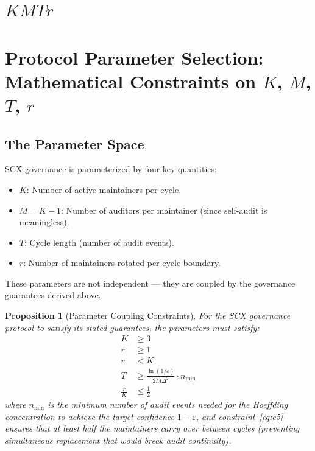\documentclass[12pt,a4paper]{article}
\newtheorem{proposition}[theorem]{Proposition}
\theoremstyle{remark}
\begin{document}
\noindent\textbf{}



\newpage

\section{$K$$M$$T$$r$}
\section{Protocol Parameter Selection: Mathematical Constraints on $K$, $M$, $T$, $r$}

\subsection{The Parameter Space}

SCX governance is parameterized by four key quantities:

\begin{itemize}[leftmargin=*]
    \item $K$: Number of active maintainers per cycle.
    \item $M = K-1$: Number of auditors per maintainer (since self-audit is meaningless).
    \item $T$: Cycle length (number of audit events).
    \item $r$: Number of maintainers rotated per cycle boundary.
\end{itemize}

These parameters are not independent — they are coupled by the governance
guarantees derived above.

\begin{proposition}[Parameter Coupling Constraints]\label{prop:coupling}
For the SCX governance protocol to satisfy its stated guarantees, the parameters
must satisfy:
\begin{align}
    K &\geq 3 \label{eq:c1} \\
    r &\geq 1 \label{eq:c2} \\
    r &< K \label{eq:c3} \\
    T &\geq \frac{\ln(1/\varepsilon)}{2M\Delta^2} \cdot n_{\text{min}} \label{eq:c4} \\
    \frac{r}{K} &\leq \frac{1}{2} \label{eq:c5}
\end{align}
where $n_{\text{min}}$ is the minimum number of audit events needed for the
Hoeffding concentration to achieve the target confidence $1-\varepsilon$, and
constraint~\eqref{eq:c5} ensures that at least half the maintainers carry over
between cycles (preventing simultaneous replacement that would break audit
continuity).
\end{proposition}
\end{document}
